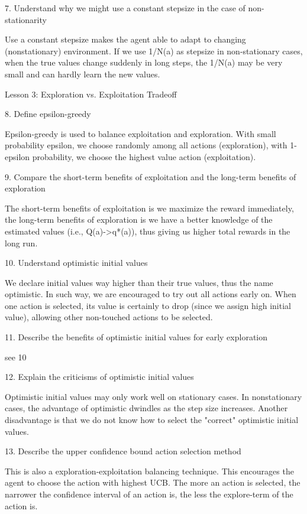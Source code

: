 \documentclass[sutton_barto_notes.tex]{subfiles}
\begin{document}
7. Understand why we might use a constant stepsize in the case of non-stationarity

Use a constant stepsize makes the agent able to adapt to changing (nonstationary) environment.
If we use 1/N(a) as stepsize in non-stationary cases, when the true values change suddenly in long steps, the 1/N(a) may be very small and can hardly learn the new values.

Lesson 3: Exploration vs. Exploitation Tradeoff

8. Define epsilon-greedy

Epsilon-greedy is used to balance exploitation and exploration. With small probability epsilon, we choose randomly among all actions (exploration), with 1-epsilon probability, we choose the highest value action (exploitation).

9. Compare the short-term benefits of exploitation and the long-term benefits of exploration

The short-term benefits of exploitation is we maximize the reward immediately, the long-term benefits of exploration is we have a better knowledge of the estimated values (i.e., Q(a)->q*(a)), thus giving us higher total rewards in the long run.

10. Understand optimistic initial values

We declare initial values way higher than their true values, thus the name optimistic. In such way, we are encouraged to try out all actions early on. When one action is selected, its value is certainly to drop (since we assign high initial value), allowing other non-touched actions to be selected.

11. Describe the benefits of optimistic initial values for early exploration

see 10

12. Explain the criticisms of optimistic initial values

Optimistic initial values may only work well on stationary cases. In nonstationary cases, the advantage of optimistic dwindles as the step size increases.
Another disadvantage is that we do not know how to select the "correct" optimistic initial values.

13. Describe the upper confidence bound action selection method

This is also a exploration-exploitation balancing technique. This encourages the agent to choose the action with highest UCB. The more an action is selected, the narrower the confidence interval of an action is, the less the explore-term of the action is.
\end{document}
